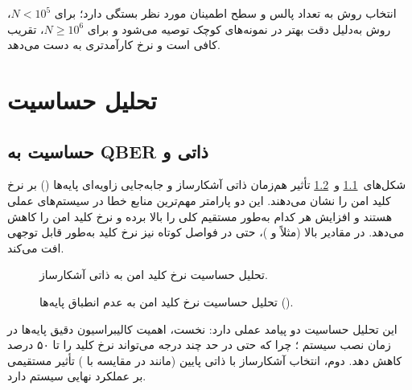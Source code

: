 انتخاب روش به تعداد پالس و سطح اطمینان مورد نظر بستگی دارد؛ برای $N < 10^5$، روش  به‌دلیل دقت بهتر در نمونه‌های کوچک توصیه می‌شود و برای $N \geq 10^6$، تقریب  کافی است و نرخ کارآمدتری به دست می‌دهد.

\chapter{تحلیل حساسیت}
\label{ch:results_sensitivity}

\section{حساسیت به QBER ذاتی و }
شکل‌های~\ref{fig:10a_sensitivity} و~\ref{fig:10b_sensitivity} تأثیر هم‌زمان  ذاتی آشکارساز و جابه‌جایی زاویه‌ای پایه‌ها () بر نرخ کلید امن را نشان می‌دهند. این دو پارامتر مهم‌ترین منابع خطا در سیستم‌های  عملی هستند و افزایش هر کدام به‌طور مستقیم  کلی را بالا برده و نرخ کلید امن را کاهش می‌دهد. در مقادیر بالا (مثلاً  و )، حتی در فواصل کوتاه نیز نرخ کلید به‌طور قابل توجهی افت می‌کند.

\begin{figure}[htbp]
\centering
{}
\caption{تحلیل حساسیت نرخ کلید امن به  ذاتی آشکارساز.}
\label{fig:10a_sensitivity}
\end{figure}

\begin{figure}[htbp]
\centering
{}
\caption{تحلیل حساسیت نرخ کلید امن به عدم انطباق پایه‌ها ().}
\label{fig:10b_sensitivity}
\end{figure}

این تحلیل حساسیت دو پیامد عملی دارد: نخست، اهمیت کالیبراسیون دقیق پایه‌ها در زمان نصب سیستم ؛ چرا که  حتی در حد چند درجه می‌تواند نرخ کلید را تا ۵۰ درصد کاهش دهد. دوم، انتخاب آشکارساز با  ذاتی پایین (مانند  در مقایسه با ) تأثیر مستقیمی بر عملکرد نهایی سیستم دارد.

